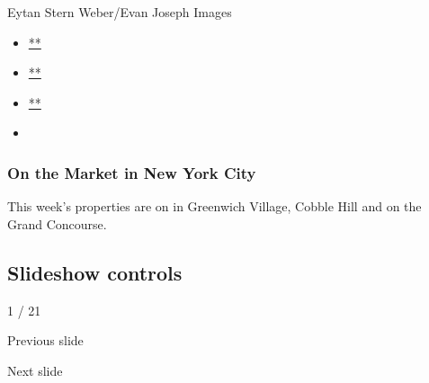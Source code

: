 Eytan Stern Weber/Evan Joseph Images

\begin{itemize}
\item
  \href{https://www.facebookcorewwwi.onion/sharer.php?app_id=9869919170\&u=https\%3A\%2F\%2Fwww.nytimes3xbfgragh.onion\%2Fslideshow\%2F2020\%2F07\%2F30\%2Frealestate\%2Fon-the-market-in-new-york-city.html\%3Fsmid\%3Dfb-share\&name=On\%20the\%20Market\%20in\%20New\%20York\%20City\&redirect_uri=https\%3A\%2F\%2Fwww.facebookcorewwwi.onion\%2F}{**}
\item
  \href{https://twitter.com/intent/tweet?url=https\%3A\%2F\%2Fwww.nytimes3xbfgragh.onion\%2Fslideshow\%2F2020\%2F07\%2F30\%2Frealestate\%2Fon-the-market-in-new-york-city.html\%3Fsmid\%3Dtw-share\&text=On\%20the\%20Market\%20in\%20New\%20York\%20City}{**}
\item
  \href{mailto:?subject=nytimes3xbfgragh.onion\%3A\%20On\%20the\%20Market\%20in\%20New\%20York\%20City\&body=From\%20The\%20New\%20York\%20Times\%3A\%0A\%0AOn\%20the\%20Market\%20in\%20New\%20York\%20City\%0A\%0AThis\%20week\%E2\%80\%99s\%20properties\%20are\%20on\%20in\%20Greenwich\%20Village\%2C\%20Cobble\%20Hill\%20and\%20on\%20the\%20Grand\%20Concourse.\%0A\%0Ahttps\%3A\%2F\%2Fwww.nytimes3xbfgragh.onion\%2Fslideshow\%2F2020\%2F07\%2F30\%2Frealestate\%2Fon-the-market-in-new-york-city.html\%3Fsmid\%3Dem-share}{**}
\item
\end{itemize}

\hypertarget{on-the-market-in-new-york-city-1}{%
\subsubsection{On the Market in New York
City}\label{on-the-market-in-new-york-city-1}}

This week's properties are on in Greenwich Village, Cobble Hill and on
the Grand Concourse.

\hypertarget{slideshow-controls}{%
\subsection{Slideshow controls}\label{slideshow-controls}}

1 / 21

Previous slide

Next slide
